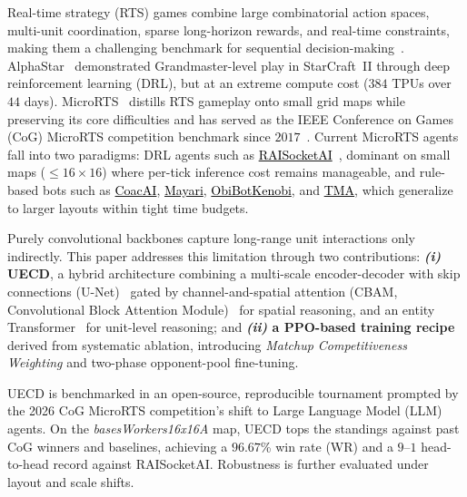 \documentclass[conference]{IEEEtran}
\newcommand{\code}[1]{{\ttfamily\hyphenchar\font=45\relax #1}}
\newcommand{\urlref}[2]{\href{#1}{\textcolor{black}{#2}}}
\begin{document}
Real-time strategy (RTS) games combine large combinatorial action spaces, multi-unit coordination, sparse long-horizon rewards, and real-time constraints, making them a challenging benchmark for sequential decision-making~\cite{buroRTSChallenge2003, ontanonSurveyRealTimeStrategy2013}. AlphaStar~\cite{vinyalsGrandmasterLevelStarCraft2019} demonstrated Grandmaster-level play in StarCraft~II through deep reinforcement learning (DRL), but at an extreme compute cost ($384$ TPUs over $44$ days). MicroRTS~\cite{ontanonCombinatorialMultiArmedBandit2013} distills RTS gameplay onto small grid maps while preserving its core difficulties and has served as the IEEE Conference on Games (CoG) MicroRTS competition benchmark since $2017$~\cite{ontanonFirstMicroRTSArtificial2018}. Current MicroRTS agents fall into two paradigms: DRL agents such as \urlref{https://github.com/sgoodfriend/rl-algo-impls}{RAISocketAI}~\cite{goodfriendCompetitionWinningDeep2024}, dominant on small maps ($\le\!16{\times}16$) where per-tick inference cost remains manageable, and rule-based bots such as \urlref{https://github.com/Coac/coac-ai-microrts}{CoacAI}, \urlref{https://github.com/barvazkrav/mayariBot}{Mayari}, \urlref{https://github.com/Jannis42/MicroRTSObiBotKenobi}{ObiBotKenobi}, and \urlref{https://github.com/MazzaAlessandro/TMA}{TMA}, which generalize to larger layouts within tight time budgets.

Purely convolutional backbones capture long-range unit interactions only indirectly. This paper addresses this limitation through two contributions: \textbf{\emph{(i)} \code{UECD}}, a hybrid architecture combining a multi-scale encoder-decoder with skip connections (U-Net)~\cite{ronnebergerUNetConvolutionalNetworks2015} gated by channel-and-spatial attention (CBAM, Convolutional Block Attention Module)~\cite{wooCBAMConvolutionalBlock2018} for spatial reasoning, and an entity Transformer~\cite{vaswaniAttentionAllYou2017} for unit-level reasoning; and \textbf{\emph{(ii)} a PPO-based training recipe}~\cite{schulmanProximalPolicyOptimization2017} derived from systematic ablation, introducing \emph{Matchup Competitiveness Weighting} and two-phase opponent-pool fine-tuning.

\code{UECD} is benchmarked in an open-source, reproducible tournament prompted by the 2026 CoG MicroRTS competition's shift to Large Language Model (LLM) agents. On the \emph{basesWorkers16x16A} map, \code{UECD} tops the standings against past CoG winners and baselines, achieving a $96.67$\% win rate (WR) and a $9$--$1$ head-to-head record against RAISocketAI. Robustness is further evaluated under layout and scale shifts.
\end{document}
